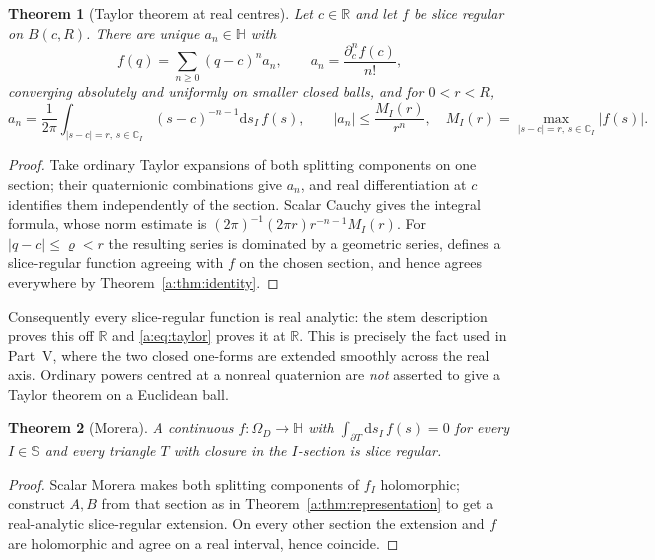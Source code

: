\documentclass[11pt,a4paper]{article}
\numberwithin{equation}{section}
\newtheorem{theorem}{Theorem}[section]
\theoremstyle{definition}
\theoremstyle{remark}
\theoremstyle{plain}
\newcommand{\HH}{\mathbb H}
\newcommand{\RR}{\mathbb R}
\newcommand{\CC}{\mathbb C}
\newcommand{\SSS}{\mathbb S}
\newcommand{\Om}{\Omega}
\newcommand{\abs}[1]{\lvert #1\rvert}
\newcommand{\dd}{\mathrm d}
\begin{document}
\begin{theorem}[Taylor theorem at real centres]
\label{a:thm:taylor}
Let $c\in\RR$ and let $f$ be slice regular on $B(c,R)$. There are unique
$a_n\in\HH$ with
\begin{equation}
 f(q)=\sum_{n\ge0}(q-c)^na_n,\qquad a_n=\frac{\partial_c^nf(c)}{n!},
 \label{a:eq:taylor}
\end{equation}
converging absolutely and uniformly on smaller closed balls, and for
$0<r<R$,
\begin{equation}
 a_n=\frac1{2\pi}\int_{\abs{s-c}=r,\,s\in\CC_I}(s-c)^{-n-1}\dd s_I\,f(s),
 \qquad
 \abs{a_n}\le\frac{M_I(r)}{r^n},\quad
 M_I(r)=\max_{\abs{s-c}=r,\,s\in\CC_I}\abs{f(s)} .
 \label{a:eq:cauchy-estimate}
\end{equation}
\end{theorem}

\begin{proof}
Take ordinary Taylor expansions of both splitting components on one section;
their quaternionic combinations give $a_n$, and real differentiation at $c$
identifies them independently of the section. Scalar Cauchy gives the integral
formula, whose norm estimate is $(2\pi)^{-1}(2\pi r)r^{-n-1}M_I(r)$. For
$\abs{q-c}\le\varrho<r$ the resulting series is dominated by a geometric
series, defines a slice-regular function agreeing with $f$ on the chosen
section, and hence agrees everywhere by Theorem~\ref{a:thm:identity}.
\end{proof}

Consequently every slice-regular function is real analytic: the stem
description proves this off $\RR$ and \eqref{a:eq:taylor} proves it at $\RR$.
This is precisely the fact used in Part~V, where the two closed one-forms are
extended smoothly across the real axis. Ordinary powers centred at a nonreal
quaternion are \emph{not} asserted to give a Taylor theorem on a Euclidean
ball.

\begin{theorem}[Morera]
\label{a:thm:morera-slice}
A continuous $f:\Om_D\to\HH$ with $\int_{\partial T}\dd s_I\,f(s)=0$ for every
$I\in\SSS$ and every triangle $T$ with closure in the $I$-section is slice
regular.
\end{theorem}

\begin{proof}
Scalar Morera makes both splitting components of $f_I$ holomorphic; construct
$A,B$ from that section as in Theorem~\ref{a:thm:representation} to get a
real-analytic slice-regular extension. On every other section the extension
and $f$ are holomorphic and agree on a real interval, hence coincide.
\end{proof}
\end{document}
